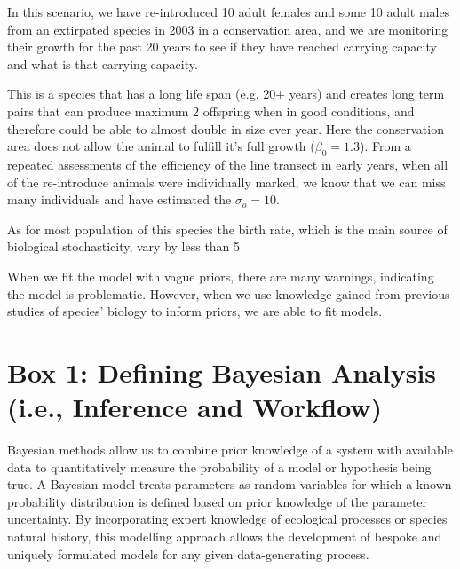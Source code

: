 \documentclass{article}
\begin{document}
\par In this scenario, we have re-introduced 10 adult females and some 10 adult males from an extirpated species in 2003 in a conservation area, and we are monitoring their growth for the past 20 years to see if they have reached carrying capacity and what is that carrying capacity.

\par This is a species that has a long life span (e.g. 20+ years) and creates long term pairs  that can produce maximum 2 offspring when in good conditions, and therefore could be able to almost double in size ever year. Here the conservation area does not allow the animal to fulfill it's full growth ($\beta_0 = 1.3$). From a repeated assessments of the efficiency of the line transect in early years, when all of the re-introduce animals were individually marked, we know that we can miss many individuals and have estimated the $\sigma_o = 10$.

\par As for most population of this species the birth rate, which is the main source of biological stochasticity, vary by less than 5%

\par When we fit the model with vague priors, there are many warnings, indicating the model is problematic. However, when we use knowledge gained from previous studies of species' biology to inform priors, we are able to fit models.

\par 
\section* {Box 1: Defining Bayesian Analysis (i.e., Inference and Workflow)}

Bayesian methods allow us to combine prior knowledge of a system with available data to quantitatively measure the probability of a model or hypothesis being true. A Bayesian model treats parameters as random variables for which a known probability distribution is defined based on prior knowledge of the parameter uncertainty. By incorporating expert knowledge of ecological processes or species natural history, this modelling approach allows the development of bespoke and uniquely formulated models for any given data-generating process.\\
\end{document}

